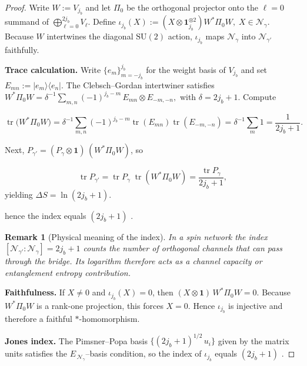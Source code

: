 \documentclass[11pt]{article}
\newtheorem{remark}{Remark}[section]
\begin{document}
\begin{proof}
  Write $W:=V_{j_b}$ and let $\Pi_0$ be the orthogonal projector onto the
  $\ell=0$ summand of $\bigoplus_{\ell=0}^{2j_b}V_{\ell}$.  Define
  \(
    \iota_{j_b}(X):=
    (X\otimes\mathbf 1_{j_b}^{\otimes2})W^{*}\Pi_0 W,
    \;X\in\mathcal N_{\gamma}.
  \)
  Because $W$ intertwines the diagonal $\mathrm{SU}(2)$ action,
  $\iota_{j_b}$ maps $\mathcal N_{\gamma}$ into
  $\mathcal N_{\gamma'}$ faithfully.

  \medskip
  \noindent\textbf{Trace calculation.}
  Write $\{e_m\}_{m=-j_b}^{j_b}$ for the weight basis of $V_{j_b}$ and set
  $E_{mn}:=|e_m\rangle\langle e_n|$.
  The Clebsch–Gordan intertwiner satisfies
  \(
    W^{*}\Pi_0 W
    =\delta^{-1}\!\sum_{m,n}(-1)^{j_b-m}\,E_{mn}\otimes E_{-m,-n},
  \)
  with $\delta=2j_b+1$.
  Compute

  \[
    \operatorname{tr}\bigl(W^{*}\Pi_0 W\bigr)
    =\delta^{-1}\sum_{m,n}(-1)^{j_b-m}
    \operatorname{tr}(E_{mn})\operatorname{tr}(E_{-m,-n})
    =\delta^{-1}\sum_{m}1
    =\frac{1}{2j_b+1}.
  \]

  Next, $P_{\gamma'}=(P_{\gamma}\otimes\mathbf1)\,(W^{*}\Pi_0 W)$, so

  \[
    \operatorname{tr}P_{\gamma'}
    =\operatorname{tr}P_{\gamma}\;\operatorname{tr}(W^{*}\Pi_0 W)
    =\frac{\operatorname{tr}P_{\gamma}}{2j_b+1},
  \]
  yielding $\Delta S=\ln(2j_b+1)$.

  hence the index equals $(2j_b+1)$ \cite[Thm.~2.1]{PopaCBMS}.

  \begin{remark}[Physical meaning of the index]
    In a spin network the index
    $[\mathcal N_{\gamma'}:\mathcal N_{\gamma}]=2j_b+1$
    counts the number of orthogonal channels that can pass through the bridge.
    Its logarithm therefore acts as a \emph{channel capacity}
    or entanglement entropy contribution.
  \end{remark}

  \noindent\textbf{Faithfulness.}
  If $X\ne0$ and $\iota_{j_b}(X)=0$,
  then $(X\otimes\mathbf1)\,W^{*}\Pi_0 W=0$.
  Because $W^{*}\Pi_0 W$ is a rank-one projection, this forces
  $X=0$.  Hence $\iota_{j_b}$ is injective and therefore a faithful
  \(*\)-homomorphism.

  \medskip
  \noindent\textbf{Jones index.}
  The Pimsner–Popa basis $\{(2j_b+1)^{1/2}\,u_i\}$ given by the matrix units
  satisfies the \(E_{\,\mathcal N_\gamma}\)–basis condition, so the index of
  $\iota_{j_b}$ equals $(2j_b+1)$ \cite[Thm.~2.1]{PopaCBMS}.
\end{proof}
\end{document}

